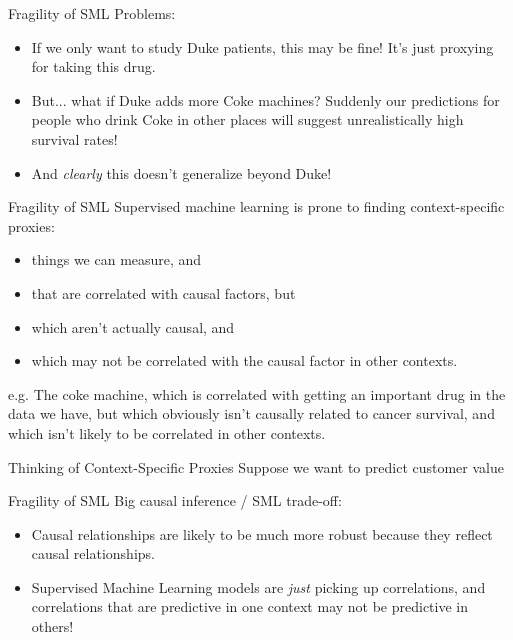\documentclass[11pt]{beamer}
\begin{document}
\begin{frame}[c]{Fragility of SML}
Problems:
\begin{itemize}
  \item If we only want to study Duke patients, this may be fine! It's just proxying for taking this drug.
  \item But... what if Duke adds more Coke machines? Suddenly our predictions for people who drink Coke in other places will suggest unrealistically high survival rates!
  \item And \emph{clearly} this doesn't generalize beyond Duke!
\end{itemize}
\end{frame}

\begin{frame}[c]{Fragility of SML}
Supervised machine learning is prone to finding \alert{context-specific proxies}:
\begin{itemize}
  \item things we can measure, and
  \item that are correlated with causal factors, but
  \item which aren't actually causal, and
  \item which may not be correlated with the causal factor in other contexts.
\end{itemize}
\pause e.g. The coke machine, which is correlated with getting an important drug in the data we have, but which obviously isn't causally related to cancer survival, and which isn't likely to be correlated in other contexts.
\end{frame}

\begin{frame}[c]{Thinking of Context-Specific Proxies}
Suppose we want to predict customer value
\end{frame}


\begin{frame}[c]{Fragility of SML}
Big causal inference / SML trade-off:
\begin{itemize}
  \pause \item Causal relationships are likely to be much more robust because they reflect causal relationships.
  \pause \item Supervised Machine Learning models are \emph{just} picking up correlations, and correlations that are predictive in one context may not be predictive in others!
\end{itemize}
\end{frame}
\end{document}

